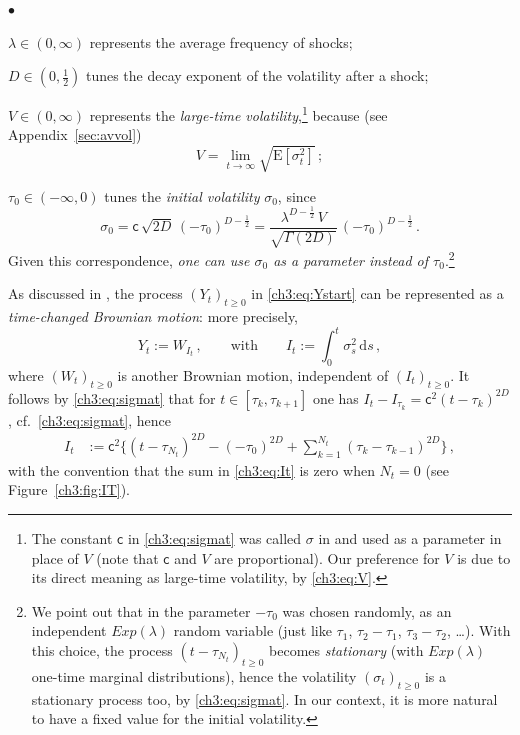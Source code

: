\documentclass[a4paper,reqno,11pt]{amsart}
\numberwithin{equation}{section}
\newcommand{\dd}{\text{\rm d}}             %
\newcommand{\PEfont}{\mathrm}
\newcommand{\E}{\ensuremath{\PEfont E}}
\newcommand\sfc{\mathsf{c}}
\newenvironment{myitemize}{%
\begin{list}{$\bullet$}%
 	{%
	\setlength{\itemsep}{0.4em}%
	\setlength{\topsep}{0.5em}%
	\setlength\leftmargin{2.45em}%
	\setlength\labelwidth{2.05em}%
	\setlength{\labelsep}{0.4em}%
	}%
	}%
{\end{list}}
\renewenvironment{itemize}{
\begin{myitemize}}%
{\end{myitemize}}
\def\dd{\mathrm{d}}
\begin{document}
\begin{itemize}
\item $\lambda \in (0,\infty)$ represents the average frequency of shocks;
\item $D \in (0,\frac{1}{2})$ tunes the decay exponent of the volatility after
a shock;
\item $V \in (0,\infty)$ represents the \emph{large-time volatility},\footnote{The
constant $\sfc$ in \eqref{ch3:eq:sigmat}
was called $\sigma$ in \cite{cf:ACDP} and
used as a parameter in place of $V$
(note that $\sfc$ and $V$ are proportional). 
Our preference for $V$ is due to its direct meaning as large-time
volatility, by \eqref{ch3:eq:V}.}
because (see Appendix~\ref{sec:avvol})
\begin{equation} \label{ch3:eq:V}
	V = \lim_{t\to\infty}\sqrt{\E[\sigma_t^2]} \,;
\end{equation}

\item $\tau_0 \in (-\infty,0)$
tunes the \emph{initial volatility} $\sigma_0$, since
\begin{equation} \label{ch3:eq:sigma0}
	\sigma_0 = \sfc \, \sqrt{2D} \, (-\tau_0)^{D-\frac{1}{2}}
	= \frac{\lambda^{D-\frac{1}{2}} \, V}{\sqrt{\Gamma(2D)}} \,
	(-\tau_0)^{D-\frac{1}{2}}  \,.
\end{equation}
Given this correspondence,
\emph{one can use $\sigma_0$ as a parameter
instead of $\tau_0$}.\footnote{We point out that in \cite{cf:ACDP}
the parameter $-\tau_0$ was chosen randomly, as an independent $Exp(\lambda)$ random variable
(just like $\tau_1$, $\tau_2-\tau_1$, $\tau_3-\tau_2$, \ldots).
With this choice, the process $(t-\tau_{N_t})_{t\ge 0}$ becomes \emph{stationary}
(with $Exp(\lambda)$ one-time marginal distributions), hence
the volatility $(\sigma_t)_{t\ge 0}$ is a stationary process too, by \eqref{ch3:eq:sigmat}.
In our context, it is more natural to have a fixed value for the initial
volatility.}
\end{itemize}



As discussed in \cite{cf:ACDP},
the process $(Y_t)_{t\ge 0}$ in \eqref{ch3:eq:Ystart}
can be represented as a \emph{time-changed Brownian motion}: more precisely,
\begin{equation} \label{ch3:eq:model0}
	Y_t := W_{I_t} \,, \qquad \text{with} \qquad
       I_t := \int_0^t \sigma_s^2 \, \dd s \,,
\end{equation}
where $(W_t)_{t\ge 0}$ is another Brownian motion, independent of $(I_t)_{t\ge 0}$.
It follows by \eqref{ch3:eq:sigmat} that
for $t \in [\tau_{k}, \tau_{k+1}]$ one has $I_t - I_{\tau_k} =
\sfc^2 (t-\tau_k)^{2D}$, cf.\ \eqref{ch3:eq:sigmat}, hence
\begin{equation} \label{ch3:eq:It}
\begin{split}
	I_t & := \sfc^2
	\Bigg\{ (t-\tau_{N_t})^{2D} - (-\tau_0)^{2D} +
	\sum_{k=1}^{N_t} (\tau_k - \tau_{k-1})^{2D} \Bigg\} \,,
\end{split}
\end{equation}
with the convention that the sum
in \eqref{ch3:eq:It} is zero when $N_t = 0$
(see Figure~\ref{ch3:fig:IT}).
\end{document}

